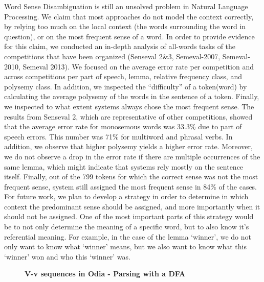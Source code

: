 \documentclass[10pt, a4paper, twopage, headinclude, footinclude, BCOR5mm]{scrartcl}
\begin{document}
\noindent
Word Sense Disambiguation is still an unsolved problem in Natural Language Processing. We claim that most approaches do not model the context correctly, by relying too much on the local context (the words surrounding the word in question), or on the most frequent sense of a word. 	In order to provide evidence for this claim, we conducted an in-depth analysis of all-words tasks of the competitions that have been organized (Senseval 2\&3, Semeval-2007, Semeval-2010, Semeval 2013). We focused on the average error rate per competition and across competitions per part of speech, lemma, relative frequency class, and polysemy class. In addition, we inspected the “difficulty” of a token(word) by calculating the average polysemy of the words in the sentence of a token. Finally, we inspected to what extent systems always chose the most frequent sense. 	The results from Senseval 2, which are representative of other competitions, showed that the average error rate for monosemous words was 33.3\% due to part of speech errors. This number was 71\% for multiword and phrasal verbs. In addition, we observe that higher polysemy yields a higher error rate. Moreover, we do not observe a drop in the error rate if there are multiple occurrences of the same lemma, which might indicate that systems rely mostly on the sentence itself. Finally, out of the 799 tokens for which the correct sense was not the most frequent sense, system still assigned the most frequent sense in 84\% of the cases. 	For future work, we plan to develop a strategy in order to determine in which context the predominant sense should be assigned, and more importantly when it should not be assigned. One of the most important parts of this strategy would be to not only determine the meaning of a specific word, but to also know it's referential meaning. For example, in the case of the lemma `winner', we do not only want to know what `winner' means, but we also want to know what this `winner' won and who this `winner' was.


\newpage

\begin{figure}[t!]
\centering
\large\textbf{V-v sequences in Odia - Parsing with a DFA}
\vspace*{0.5cm}
\end{figure}


        \begin{table}[t!]
    \end{table}
\end{document}

